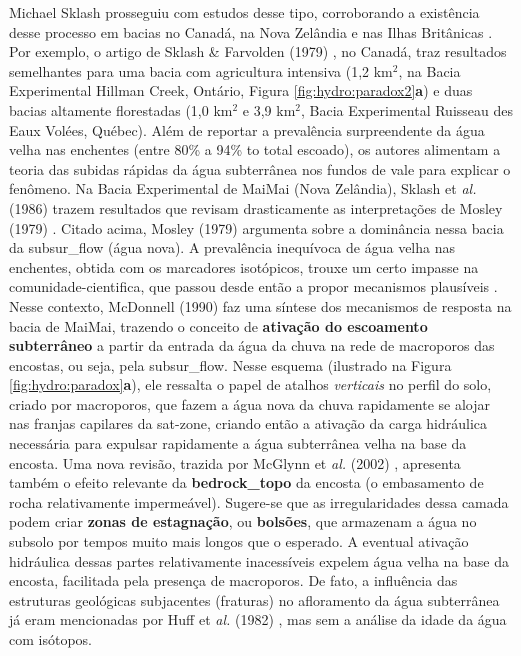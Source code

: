 \documentclass[./main.tex]{subfiles}
\begin{document}
\noindent Michael Sklash prosseguiu com estudos desse tipo, corroborando a existência desse processo em bacias no Canadá, na Nova Zelândia e nas Ilhas Britânicas \cite{sklash1979, sklash1986, sklash1996}. Por exemplo, o artigo de Sklash \& Farvolden (1979) \cite{sklash1979}, no Canadá, traz resultados semelhantes para uma bacia com agricultura intensiva (1,2 km$^2$, na Bacia Experimental Hillman Creek, Ontário, Figura \ref{fig:hydro:paradox2}\textbf{a}) e duas bacias altamente florestadas (1,0 km$^2$ e 3,9 km$^2$, Bacia Experimental Ruisseau des Eaux Volées, Québec). Além de reportar a prevalência surpreendente da água velha nas enchentes (entre 80\% a 94\% to total escoado), os autores alimentam a \gls{teoria} das subidas rápidas da água subterrânea nos fundos de vale para explicar o fenômeno. Na Bacia Experimental de MaiMai (Nova Zelândia), Sklash et \textit{al.} (1986) \cite{sklash1986} trazem resultados que revisam drasticamente as interpretações de Mosley (1979) \cite{Mosley1979}. Citado acima, Mosley (1979) argumenta sobre a dominância nessa bacia da \gls{subsur_flow} (água nova). A prevalência inequívoca de água velha nas enchentes, obtida com os marcadores isotópicos, trouxe um certo impasse na \gls{comunidade-cientifica}, que passou desde então a propor mecanismos plausíveis \cite{buttle1994}. Nesse contexto, McDonnell (1990) \cite{mcdonnell1990} faz uma síntese dos mecanismos de resposta na bacia de MaiMai, trazendo o conceito de \textbf{ativação do escoamento subterrâneo} a partir da entrada da água da chuva na rede de macroporos das encostas, ou seja, pela \gls{subsur_flow}. Nesse esquema (ilustrado na Figura \ref{fig:hydro:paradox}\textbf{a}), ele ressalta o papel de atalhos \textit{verticais} no perfil do solo, criado por macroporos, que fazem a água nova da chuva rapidamente se alojar nas franjas capilares da \gls{sat-zone}, criando então a ativação da carga hidráulica necessária para expulsar rapidamente a água subterrânea velha na base da encosta. Uma nova revisão, trazida por McGlynn et \textit{al.} (2002) \cite{mcglynn2002}, apresenta também o efeito relevante da \textbf{\gls{bedrock_topo}} da encosta (o embasamento de rocha relativamente impermeável). Sugere-se que as irregularidades dessa camada podem criar \textbf{zonas de estagnação}, ou \textbf{bolsões}, que armazenam a água no subsolo por tempos muito mais longos que o esperado. A eventual ativação hidráulica dessas partes relativamente inacessíveis expelem água velha na base da encosta, facilitada pela presença de macroporos. De fato, a influência das estruturas geológicas subjacentes (fraturas) no afloramento da água subterrânea já eram mencionadas por Huff et \textit{al.} (1982) \cite{Huff1982}, mas sem a análise da idade da água com isótopos.
\end{document}
